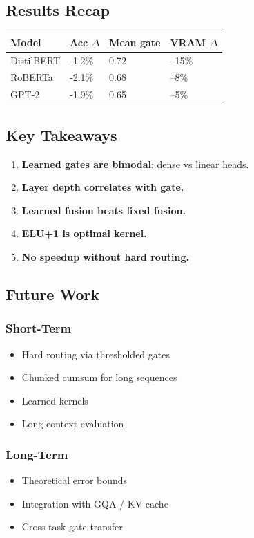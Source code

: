 \subsection{Results Recap}

\begin{table}[H]
\centering
\small
\begin{tabular}{llll}
\toprule
\textbf{Model} & \textbf{Acc $\Delta$} & \textbf{Mean gate} & \textbf{VRAM $\Delta$} \\
\midrule
DistilBERT & -1.2\% & 0.72 & --15\% \\
RoBERTa & -2.1\% & 0.68 & --8\% \\
GPT-2 & -1.9\% & 0.65 & --5\% \\
\bottomrule
\end{tabular}
\end{table}

\subsection{Key Takeaways}

\begin{enumerate}
\item \textbf{Learned gates are bimodal}: dense vs linear heads.
\item \textbf{Layer depth correlates with gate.}
\item \textbf{Learned fusion beats fixed fusion.}
\item \textbf{ELU+1 is optimal kernel.}
\item \textbf{No speedup without hard routing.}

\end{enumerate}
\subsection{Future Work}

\subsubsection{Short-Term}
\begin{itemize}
\item Hard routing via thresholded gates
\item Chunked cumsum for long sequences
\item Learned kernels
\item Long-context evaluation

\end{itemize}
\subsubsection{Long-Term}
\begin{itemize}
\item Theoretical error bounds
\item Integration with GQA / KV cache
\item Cross-task gate transfer

\end{itemize}
